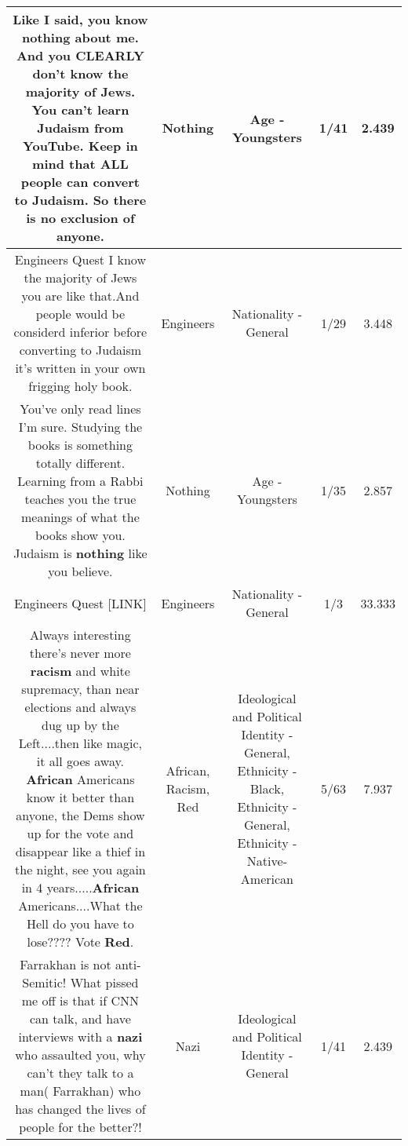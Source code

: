 \documentclass[11pt]{article}
\newlength\mylength
\begin{document}
\begin{center}
\begin{longtable}{|C{.65\mylength}|C{.30\mylength}|C{.12\mylength}|C{.12\mylength}|C{.12\mylength}|}
  \small {} Like I said, you know \textbf{nothing} about me. And you CLEARLY don't know the majority of Jews. You can't learn Judaism from YouTube. Keep in mind that ALL people can convert to Judaism. So there is no exclusion of anyone.\normalsize   & Nothing & Age - Youngsters & 1/41 & 2.439 \\  \hline
  \small Engineers Quest I know the majority of Jews you are like that.And people would be considerd inferior before converting to Judaism it's written in your own frigging holy book.\normalsize   & Engineers & Nationality - General & 1/29 & 3.448 \\  \hline
  \small {} You've only read lines I'm sure. Studying the books is something totally different. Learning from a Rabbi teaches you the true meanings of what the books show you. Judaism is \textbf{nothing} like you believe.\normalsize   & Nothing & Age - Youngsters & 1/35 & 2.857 \\  \hline
  \small Engineers Quest  [LINK] \normalsize   & Engineers & Nationality - General & 1/3 & 33.333 \\  \hline
  \small Always interesting there's never more \textbf{racism} and white supremacy, than near elections and always dug up by the Left....then like magic, it all goes away. \textbf{African} Americans know it better than anyone, the Dems show up for the vote and disappear like a thief in the night, see you again in 4 years.....\textbf{African} Americans....What the Hell do you have to lose???? Vote \textbf{R\textbf{ed}}.\normalsize   & African, Racism, Red &  Ideological and Political Identity - General, Ethnicity - Black, Ethnicity - General, Ethnicity - Native-American & 5/63 & 7.937 \\  \hline
  \small Farrakhan is not anti-Semitic! What pissed me off is that if CNN can talk, and have interviews with a \textbf{nazi} who assaulted you, why can't they talk to a man( Farrakhan) who has changed the lives of people for the better?!\normalsize   & Nazi &  Ideological and Political Identity - General & 1/41 & 2.439 \\  \hline

\end{longtable}
\end{center}
\end{document}
